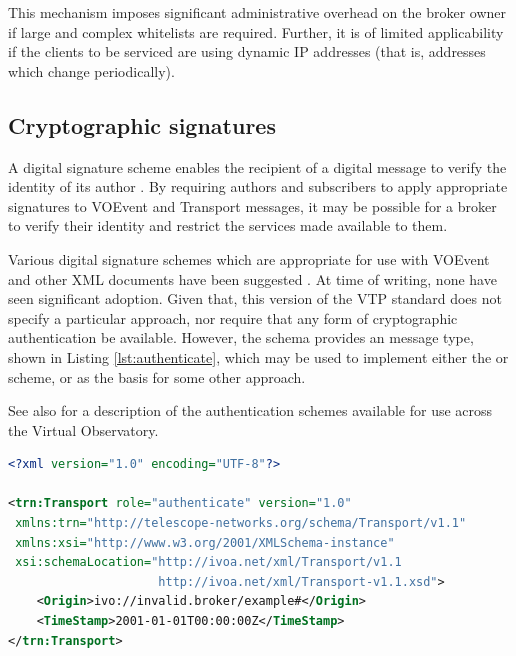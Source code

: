 \documentclass[a4paper,11pt]{ivoa}
\begin{document}
This mechanism imposes significant administrative overhead on the broker owner
if large and complex whitelists are required. Further, it is of limited
applicability if the clients to be serviced are using dynamic IP addresses
(that is, addresses which change periodically).

\subsection{Cryptographic signatures}
\label{sec:limit:crypto}

A digital signature scheme enables the recipient of a digital message to
verify the identity of its author \citep{Diffie:1976}. By requiring authors
and subscribers to apply appropriate signatures to VOEvent and Transport
messages, it may be possible for a broker to verify their identity and
restrict the services made available to them.

Various digital signature schemes which are appropriate for use with VOEvent
and other XML documents have been suggested \citep{Allen:2008, Denny:2008}. At
time of writing, none have seen significant adoption. Given that, this version
of the VTP standard does not specify a particular approach, nor require that
any form of cryptographic authentication be available. However, the
 schema provides an  message type,
shown in Listing \ref{lst:authenticate}, which may be used to implement either
the \citeauthor{Allen:2008} or \citeauthor{Denny:2008} scheme, or as the basis
for some other approach.

See also \citet{std:SSOAUTH2} for a description of the authentication schemes
available for use across the Virtual Observatory.

\begin{lstlisting}[language=XML,caption=Sample \xmlel{authenticate} message.,
                   label=lst:authenticate]
<?xml version="1.0" encoding="UTF-8"?>

<trn:Transport role="authenticate" version="1.0"
 xmlns:trn="http://telescope-networks.org/schema/Transport/v1.1"
 xmlns:xsi="http://www.w3.org/2001/XMLSchema-instance"
 xsi:schemaLocation="http://ivoa.net/xml/Transport/v1.1
                     http://ivoa.net/xml/Transport-v1.1.xsd">
    <Origin>ivo://invalid.broker/example#</Origin>
    <TimeStamp>2001-01-01T00:00:00Z</TimeStamp>
</trn:Transport>
\end{lstlisting}

\newpage
\appendix
\end{document}
